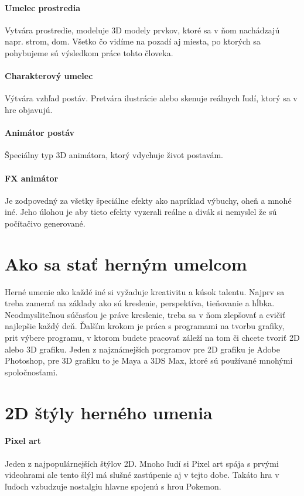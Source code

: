 \documentclass[10pt,twoside,slovak,a4paper]{article}
\begin{document}
\paragraph{Umelec prostredia} Vytvára prostredie, modeluje 3D modely prvkov, ktoré sa v ňom nachádzajú napr. strom, dom. Všetko čo vidíme na pozadí aj miesta, po ktorých sa pohybujeme sú výsledkom práce tohto človeka.
\cite{spectrum}

\paragraph{Charakterový umelec} Výtvára vzhľad postáv. Pretvára ilustrácie alebo skenuje reálnych ľudí, ktorý sa v hre objavujú.
\cite{spectrum1}

\paragraph{Animátor postáv} Špeciálny typ 3D animátora, ktorý vdychuje život postavám. 
\cite{spectrum2}

\paragraph{FX animátor}Je zodpovedný za všetky špeciálne efekty ako napríklad výbuchy, oheň a mnohé iné. Jeho úlohou je aby tieto efekty vyzerali reálne a divák si nemyslel že sú počítačivo generované.
\cite{spectrum3}

\section{Ako sa stať herným umelcom}
Herné umenie ako každé iné si vyžaduje kreativitu a kúsok talentu. Najprv sa treba zamerať na základy ako sú kreslenie, perspektíva, tieňovanie a hĺbka. Neodmysliteľnou súčasťou je práve kreslenie, treba sa v ňom zlepšovať a cvičiť najlepšie každý deň. Ďalším krokom je práca s programami na tvorbu grafiky, prit výbere programu, v ktorom budete pracovať záleží na tom či chcete tvoriť 2D alebo 3D grafiku. Jeden z najznámejších porgramov pre 2D grafiku je Adobe Photoshop, pre 3D grafiku to je Maya a 3DS Max, ktoré sú používané mnohými spoločnosťami.
\cite{1}






\section{2D štýly herného umenia}
\cite{2D}
\paragraph{Pixel art}
Jeden z najpopulárnejších štýlov 2D. Mnoho ľudí si Pixel art spája s prvými videohrami ale tento šlýl má slušné zastúpenie aj v tejto dobe. Takáto hra v ľuďoch vzbudzuje nostalgiu hlavne spojenú s hrou Pokemon.
\end{document}
